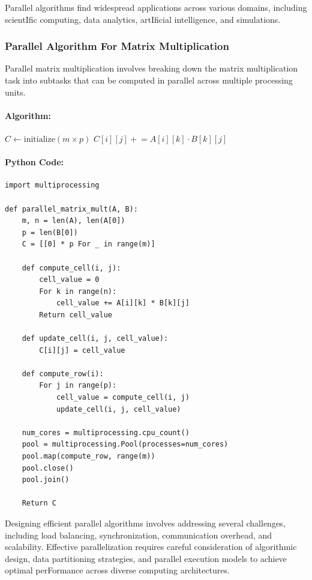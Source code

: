 \documentclass[12pt]{book} %
\begin{document}
Parallel algorithms find widespread applications across various domains, including scientIfic computing, data analytics, artIficial intelligence, and simulations. 
\subsubsection{Parallel Algorithm For Matrix Multiplication}
\FloatBarrier
Parallel matrix multiplication involves breaking down the matrix multiplication task into subtasks that can be computed in parallel across multiple processing units.
\FloatBarrier
\paragraph{Algorithm:}
\FloatBarrier

\begin{algorithm}
\caption{Parallel Matrix Multiplication}
\begin{algorithmic}

    \State $C \gets \text{initialize}(m \times p)$
                \State $C[i][j] \mathrel{+}= A[i][k] \cdot B[k][j]$
            \EndFor
        \EndFor
    \EndFor
\EndFunction
\end{algorithmic}
\end{algorithm}
\FloatBarrier
\paragraph{Python Code:}
\FloatBarrier
\begin{verbatim}
import multiprocessing

def parallel_matrix_mult(A, B):
    m, n = len(A), len(A[0])
    p = len(B[0])
    C = [[0] * p For _ in range(m)]

    def compute_cell(i, j):
        cell_value = 0
        For k in range(n):
            cell_value += A[i][k] * B[k][j]
        Return cell_value

    def update_cell(i, j, cell_value):
        C[i][j] = cell_value

    def compute_row(i):
        For j in range(p):
            cell_value = compute_cell(i, j)
            update_cell(i, j, cell_value)

    num_cores = multiprocessing.cpu_count()
    pool = multiprocessing.Pool(processes=num_cores)
    pool.map(compute_row, range(m))
    pool.close()
    pool.join()

    Return C
\end{verbatim}
\FloatBarrier
Designing efficient parallel algorithms involves addressing several challenges, including load balancing, synchronization, communication overhead, and scalability. Effective parallelization requires careful consideration of algorithmic design, data partitioning strategies, and parallel execution models to achieve optimal perFormance across diverse computing architectures.
\end{document}

